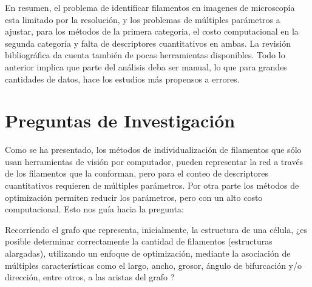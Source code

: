 \documentclass{article}
\begin{document}
En resumen, el problema de identificar filamentos en imagenes de microscop\'ia esta limitado por la resoluci\'on, y los problemas de m\'ultiples par\'ametros a ajustar, para los m\'etodos de la primera categoria, el costo computacional en la segunda categor\'ia y falta de descriptores cuantitativos en ambas. La revisi\'on bibliogr\'afica da cuenta tambi\'en de pocas herramientas disponibles. Todo lo anterior implica que parte del an\'alisis deba ser manual, lo que para grandes cantidades de datos, hace los estudios m\'as propensos a errores. 

\section{Preguntas de Investigaci\'on}

Como se ha presentado, los m\'etodos de individualizaci\'on de filamentos que s\'olo usan herramientas de visi\'on por computador, pueden representar la red a trav\'es de los filamentos que la conforman, pero para el conteo de descriptores cuantitativos requieren de m\'ultiples par\'ametros. Por otra parte los m\'etodos de optimizaci\'on permiten reducir los par\'ametros, pero con un alto costo computacional. Esto nos gu\'ia hacia la pregunta:

\smallskip
Recorriendo el grafo que representa, inicialmente, la estructura de una c\'elula, ¿es posible determinar correctamente la cantidad de filamentos (estructuras alargadas), utilizando un enfoque de optimizaci\'on, mediante la asociaci\'on de m\'ultiples caracter\'isticas como el largo, ancho, grosor, \'angulo de bifurcaci\'on y/o direcci\'on, entre otros, a las aristas del grafo ? 
\end{document}
